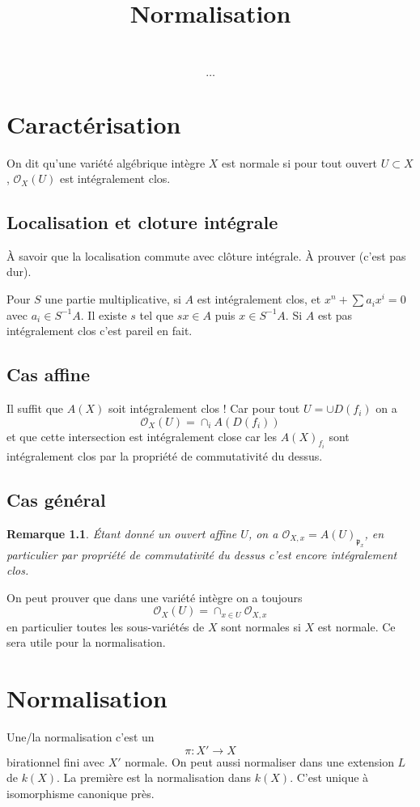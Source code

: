 \documentclass[a4paper,12pt]{book}
\title{Normalisation}
\date{}
\newcommand{\Or}{\mathcal{O}}
\newcommand{\p}{\mathfrak{p}}
\theoremstyle{plain}
\newtheorem{rem}{Remarque}
\theoremstyle{definition}
\theoremstyle{remark}
\begin{document}
\maketitle
\tableofcontents
\[\ldots\]   
\chapter{Caractérisation}
On dit qu'une variété algébrique intègre $X$ est normale si pour
tout ouvert $U\subset X$, $\Or_X(U)$ est intégralement clos.
\section{Localisation et cloture intégrale}
À savoir que la localisation commute avec clôture intégrale.
À prouver (c'est pas dur).

Pour $S$ une partie multiplicative, si $A$ est intégralement clos,
et $x^n+\sum a_i x^i=0$ avec $a_i\in S^{-1}A$. Il existe $s$ tel
que $sx\in A$ puis $x\in S^{-1}A$. Si $A$ est pas intégralement
clos c'est pareil en fait.

\section{Cas affine}
Il suffit que $A(X)$ soit intégralement clos ! Car pour tout 
$U=\cup D(f_i)$ on a \[\Or_X(U)=\cap_i A(D(f_i))\]
et que cette intersection est intégralement close car les
$A(X)_{f_i}$ sont intégralement clos par la propriété de 
commutativité du dessus.

\section{Cas général}
\begin{rem}
    Étant donné un ouvert affine $U$, on a $\Or_{X,x}=A(U)_{\p_x}$,
    en particulier par propriété de commutativité du dessus
    c'est encore intégralement clos.
\end{rem}
On peut prouver que dans une variété intègre on a toujours
\[\Or_X(U)=\cap_{x\in U} \Or_{X,x}\]
en particulier toutes les sous-variétés de $X$ sont normales si
$X$ est normale. Ce sera utile pour la normalisation.

\chapter{Normalisation}
Une/la normalisation c'est un 
\[\pi\colon X'\to X\]
birationnel fini avec $X'$ normale. On peut aussi normaliser dans 
une extension $L$ de $k(X)$. La première est la normalisation
dans $k(X)$. C'est unique à isomorphisme canonique près.
\end{document}
